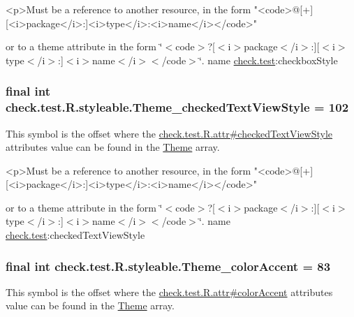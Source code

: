 \begin{DoxyVerb}      <p>Must be a reference to another resource, in the form "<code>@[+][<i>package</i>:]<i>type</i>:<i>name</i></code>"
\end{DoxyVerb}
 or to a theme attribute in the form \char`\"{}$<$code$>$?\mbox{[}$<$i$>$package$<$/i$>$\+:\mbox{]}\mbox{[}$<$i$>$type$<$/i$>$\+:\mbox{]}$<$i$>$name$<$/i$>$$<$/code$>$\char`\"{}.  name \hyperlink{namespacecheck_1_1test}{check.\+test}\+:checkbox\+Style \hypertarget{classcheck_1_1test_1_1_r_1_1styleable_a3ea486b33baebd01084683194dba833d}{}
\subsubsection[{Theme\+\_\+checked\+Text\+View\+Style}]{\setlength{\rightskip}{0pt plus 5cm}final int check.\+test.\+R.\+styleable.\+Theme\+\_\+checked\+Text\+View\+Style = 102\hspace{0.3cm}{\ttfamily [static]}}\label{classcheck_1_1test_1_1_r_1_1styleable_a3ea486b33baebd01084683194dba833d}
This symbol is the offset where the \hyperlink{classcheck_1_1test_1_1_r_1_1attr_a7a88a225f47722cfdec2c251480bbaef}{check.\+test.\+R.\+attr\#checked\+Text\+View\+Style} attribute\textquotesingle{}s value can be found in the \hyperlink{classcheck_1_1test_1_1_r_1_1styleable_acca726d02016a0cf607782ec3a436a81}{Theme} array.

\begin{DoxyVerb}      <p>Must be a reference to another resource, in the form "<code>@[+][<i>package</i>:]<i>type</i>:<i>name</i></code>"
\end{DoxyVerb}
 or to a theme attribute in the form \char`\"{}$<$code$>$?\mbox{[}$<$i$>$package$<$/i$>$\+:\mbox{]}\mbox{[}$<$i$>$type$<$/i$>$\+:\mbox{]}$<$i$>$name$<$/i$>$$<$/code$>$\char`\"{}.  name \hyperlink{namespacecheck_1_1test}{check.\+test}\+:checked\+Text\+View\+Style \hypertarget{classcheck_1_1test_1_1_r_1_1styleable_a0066926f266b5ba28e4da64a5ee29bb9}{}
\subsubsection[{Theme\+\_\+color\+Accent}]{\setlength{\rightskip}{0pt plus 5cm}final int check.\+test.\+R.\+styleable.\+Theme\+\_\+color\+Accent = 83\hspace{0.3cm}{\ttfamily [static]}}\label{classcheck_1_1test_1_1_r_1_1styleable_a0066926f266b5ba28e4da64a5ee29bb9}
This symbol is the offset where the \hyperlink{classcheck_1_1test_1_1_r_1_1attr_aa81fc3f823f687d62d265d42b27599e5}{check.\+test.\+R.\+attr\#color\+Accent} attribute\textquotesingle{}s value can be found in the \hyperlink{classcheck_1_1test_1_1_r_1_1styleable_acca726d02016a0cf607782ec3a436a81}{Theme} array.

